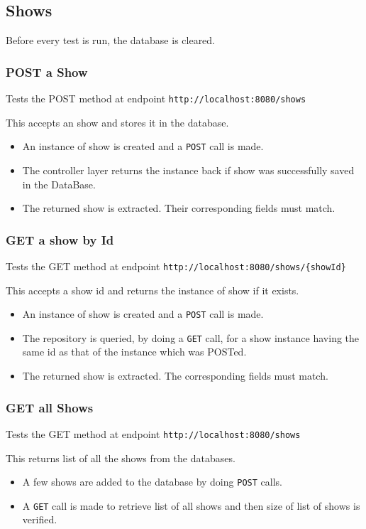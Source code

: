 \documentclass[]{article}
\providecommand{\tightlist}{%
  \setlength{\itemsep}{0pt}\setlength{\parskip}{0pt}}
\begin{document}
\hypertarget{shows}{%
\subsection{Shows}\label{shows}}

Before every test is run, the database is cleared.

\hypertarget{post-a-show}{%
\subsubsection{POST a Show}\label{post-a-show}}

Tests the POST method at endpoint \texttt{http://localhost:8080/shows}

This accepts an show and stores it in the database.

\begin{itemize}
\tightlist
\item
  An instance of show is created and a \texttt{POST} call is made.
\item
  The controller layer returns the instance back if show was
  successfully saved in the DataBase.
\item
  The returned show is extracted. Their corresponding fields must match.
\end{itemize}

\hypertarget{get-a-show-by-id}{%
\subsubsection{GET a show by Id}\label{get-a-show-by-id}}

Tests the GET method at endpoint
\texttt{http://localhost:8080/shows/\{showId\}}

This accepts a show id and returns the instance of show if it exists.

\begin{itemize}
\tightlist
\item
  An instance of show is created and a \texttt{POST} call is made.
\item
  The repository is queried, by doing a \texttt{GET} call, for a show
  instance having the same id as that of the instance which was POSTed.
\item
  The returned show is extracted. The corresponding fields must match.
\end{itemize}

\hypertarget{get-all-shows}{%
\subsubsection{GET all Shows}\label{get-all-shows}}

Tests the GET method at endpoint \texttt{http://localhost:8080/shows}

This returns list of all the shows from the databases.

\begin{itemize}
\tightlist
\item
  A few shows are added to the database by doing \texttt{POST} calls.
\item
  A \texttt{GET} call is made to retrieve list of all shows and then
  size of list of shows is verified.
\end{itemize}
\end{document}
